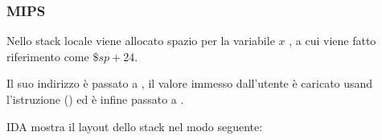 \subsubsection{MIPS}

Nello stack locale viene allocato spazio per la variabile $x$ , a cui viene fatto riferimento come $\$sp+24$.

Il suo indirizzo è passato a \scanf, il valore immesso dall'utente è caricato usand l'istruzione  () ed è infine passato a \printf.



IDA mostra il layout dello stack nel modo seguente:



